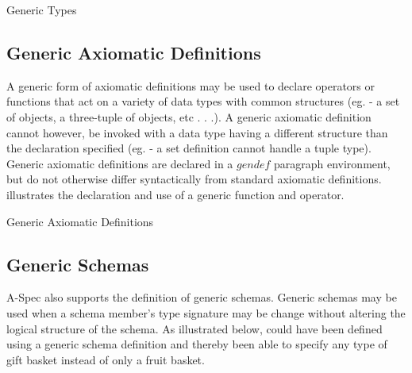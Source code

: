 \documentclass[letterpaper,10pt,draft]{book}
\begin{document}
\begin{example}
\begin{minipage}[t]{0.49\linewidth}
   
\end{minipage}
\begin{minipage}[t]{0.49\linewidth}
   \azed
   
\end{minipage}

   \caption{Generic Types}
   \label{ex:GenType}
\end{example}

\subsection{Generic Axiomatic Definitions}
   \label{sect:GenDef}

A generic form of axiomatic definitions may be used to declare operators or functions
that act on a variety of data types with common structures (eg. - a set of objects,
a three-tuple of objects, etc . . .).  A generic axiomatic definition cannot however,
be invoked with a data type having a different structure than the declaration specified
(eg. - a set definition cannot handle a tuple type).  Generic axiomatic definitions
are declared in a $gendef$ paragraph environment, but do not otherwise differ syntactically
from standard axiomatic definitions.   illustrates the declaration
and use of a generic function and operator.

\begin{example}
\begin{minipage}[t]{0.49\linewidth}
   
\end{minipage}
\begin{minipage}[t]{0.49\linewidth}
   \azsch
   
\end{minipage}

   \caption{Generic Axiomatic Definitions}
   \label{ex:GenDef}
\end{example}

\subsection{Generic Schemas}
   \label{sect:GenSch}

A-Spec also supports the definition of generic schemas.  Generic schemas may be
used when a schema member's type signature may be change without altering the logical
structure of the schema.  As illustrated below,  could have been
defined using a generic schema definition and thereby been able to specify any type
of gift basket instead of only a fruit basket.
\end{document}
